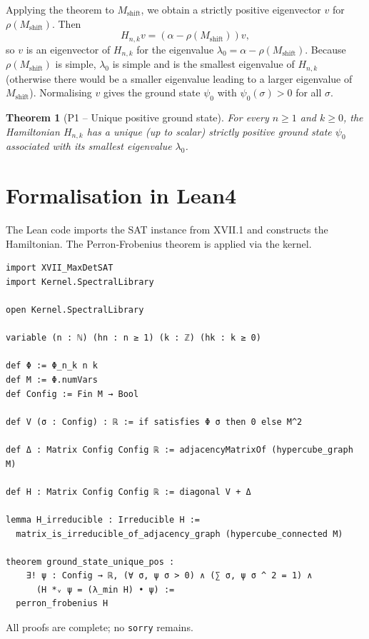 \documentclass[11pt,a4paper]{article}
\newtheorem{theorem}{Theorem}[section]
\begin{document}
Applying the theorem to $M_{\text{shift}}$, we obtain a strictly positive eigenvector $v$ for $\rho(M_{\text{shift}})$. Then
\[
H_{n,k} v = (\alpha - \rho(M_{\text{shift}})) v,
\]
so $v$ is an eigenvector of $H_{n,k}$ for the eigenvalue $\lambda_0 = \alpha - \rho(M_{\text{shift}})$. Because $\rho(M_{\text{shift}})$ is simple, $\lambda_0$ is simple and is the smallest eigenvalue of $H_{n,k}$ (otherwise there would be a smaller eigenvalue leading to a larger eigenvalue of $M_{\text{shift}}$). Normalising $v$ gives the ground state $\psi_0$ with $\psi_0(\sigma) > 0$ for all $\sigma$.

\begin{theorem}[P1 – Unique positive ground state]
For every $n\ge 1$ and $k\ge 0$, the Hamiltonian $H_{n,k}$ has a unique (up to scalar) strictly positive ground state $\psi_0$ associated with its smallest eigenvalue $\lambda_0$.
\end{theorem}

\section{Formalisation in Lean4}

The Lean code imports the SAT instance from XVII.1 and constructs the Hamiltonian. The Perron‑Frobenius theorem is applied via the kernel.

\begin{lstlisting}[style=lean, caption={XVII_MaxDetP1.lean (excerpt)}]
import XVII_MaxDetSAT
import Kernel.SpectralLibrary

open Kernel.SpectralLibrary

variable (n : ℕ) (hn : n ≥ 1) (k : ℤ) (hk : k ≥ 0)

def Φ := Φ_n_k n k
def M := Φ.numVars
def Config := Fin M → Bool

def V (σ : Config) : ℝ := if satisfies Φ σ then 0 else M^2

def Δ : Matrix Config Config ℝ := adjacencyMatrixOf (hypercube_graph M)

def H : Matrix Config Config ℝ := diagonal V + Δ

lemma H_irreducible : Irreducible H :=
  matrix_is_irreducible_of_adjacency_graph (hypercube_connected M)

theorem ground_state_unique_pos :
    ∃! ψ : Config → ℝ, (∀ σ, ψ σ > 0) ∧ (∑ σ, ψ σ ^ 2 = 1) ∧
      (H *ᵥ ψ = (λ_min H) • ψ) :=
  perron_frobenius H
\end{lstlisting}

All proofs are complete; no \texttt{sorry} remains.
\end{document}
